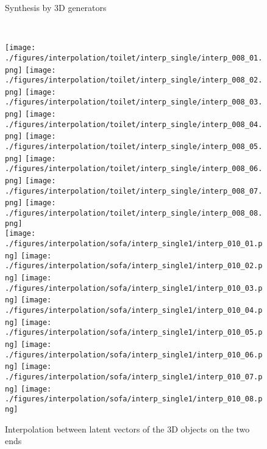 \documentclass[10pt,twocolumn,letterpaper]{article}
\begin{document}
\begin{figure*}
\begin{minipage}[b]{.34\textwidth}
  \caption{Synthesis by 3D generators}
  \label{fig:synthesis_generator}
\end{minipage}%
~
\begin{minipage}[b]{.64\textwidth}
  \centering
  	\texttt{[image: ./figures/interpolation/toilet/interp\_single/interp\_008\_01.png]}\hspace{-3.5mm} 
	\texttt{[image: ./figures/interpolation/toilet/interp\_single/interp\_008\_02.png]}\hspace{-3.5mm} 
	\texttt{[image: ./figures/interpolation/toilet/interp\_single/interp\_008\_03.png]}\hspace{-3.5mm} 
    \texttt{[image: ./figures/interpolation/toilet/interp\_single/interp\_008\_04.png]}\hspace{-3.5mm} 
    \texttt{[image: ./figures/interpolation/toilet/interp\_single/interp\_008\_05.png]}\hspace{-3.5mm} 
    \texttt{[image: ./figures/interpolation/toilet/interp\_single/interp\_008\_06.png]}\hspace{-3.5mm} 
    \texttt{[image: ./figures/interpolation/toilet/interp\_single/interp\_008\_07.png]}\hspace{-3.5mm} 
    \texttt{[image: ./figures/interpolation/toilet/interp\_single/interp\_008\_08.png]}\\
    	\texttt{[image: ./figures/interpolation/sofa/interp\_single1/interp\_010\_01.png]} \hspace{-1.7mm} 
	\texttt{[image: ./figures/interpolation/sofa/interp\_single1/interp\_010\_02.png]} \hspace{-1.7mm}  
	\texttt{[image: ./figures/interpolation/sofa/interp\_single1/interp\_010\_03.png]} \hspace{-1.7mm} 
	\texttt{[image: ./figures/interpolation/sofa/interp\_single1/interp\_010\_04.png]} \hspace{-1.7mm}  
	\texttt{[image: ./figures/interpolation/sofa/interp\_single1/interp\_010\_05.png]} \hspace{-1.7mm} 
	\texttt{[image: ./figures/interpolation/sofa/interp\_single1/interp\_010\_06.png]} \hspace{-1.7mm} 
	\texttt{[image: ./figures/interpolation/sofa/interp\_single1/interp\_010\_07.png]} \hspace{-1.7mm} 
	\texttt{[image: ./figures/interpolation/sofa/interp\_single1/interp\_010\_08.png]}
  \caption{Interpolation between latent vectors of the 3D objects on the two ends}
  \label{fig:interpolation}
\end{minipage}
\end{figure*}
\end{document}
